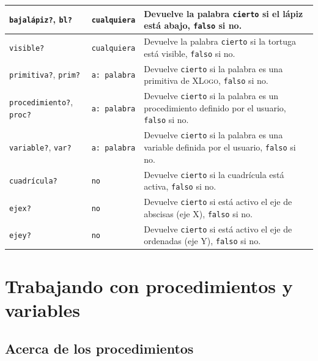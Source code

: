 \begin{center}
\begin{longtable}{|m{3cm}|m{3cm}|m{9cm}|}
   \texttt{bajal\'apiz?}, \index{bajal\'apiz?@\texttt{bajal\'apiz?}} 
     \texttt{bl?} \index{bl?@\texttt{bl?}} & \texttt{cualquiera} &
        Devuelve la palabra \texttt{cierto} si el l\'apiz est\'a abajo,
        \texttt{falso} si no. \\ \hline 
   \texttt{visible?} \index{visible?@\texttt{visible?}} &
      \texttt{cualquiera} & 
        Devuelve la palabra \texttt{cierto} si la tortuga est\'a visible,
        \texttt{falso} si no. \\ \hline 
   \texttt{primitiva?}, \index{primitiva?@\texttt{primitiva?}}
     \texttt{prim?} \index{prim?@\texttt{prim?}} & \texttt{a: palabra} &
        Devuelve \texttt{cierto} si la palabra es una primitiva de
        \textsc{XLogo}, \texttt{falso} si no. \\ \hline 
   \texttt{procedimiento?}, \index{procedimiento?@\texttt{procedimiento?}}
     \texttt{proc?} \index{proc?@\texttt{proc?}} & \texttt{a: palabra} &
        Devuelve \texttt{cierto} si la palabra es un procedimiento definido
        por el usuario, \texttt{falso} si no. \\ \hline
   \texttt{variable?}, \index{variable?@\texttt{variable?}}
     \texttt{var?} \index{var?@\texttt{var?}} & \texttt{a: palabra} &
        Devuelve \texttt{cierto} si la palabra es una variable definida
        por el usuario, \texttt{falso} si no. \\ \hline
   \texttt{cuadr\'icula?} \index{cuadr\'icula?@\texttt{cuadr\'icula?}} & \texttt{no} &
        Devuelve \texttt{cierto} si la cuadr\'icula est\'a activa,
        \texttt{falso} si no. \\ \hline
   \texttt{ejex?} \index{ejex?@\texttt{ejex?}} & \texttt{no} &
        Devuelve \texttt{cierto} si est\'a activo el eje de abscisas (eje X), 
        \texttt{falso} si no. \\ \hline
   \texttt{ejey?} \index{ejey?@\texttt{ejey?}} & \texttt{no} &
        Devuelve \texttt{cierto} si est\'a activo el eje de ordenadas (eje Y), 
        \texttt{falso} si no. \\ \hline
\end{longtable} \end{center}

\section{Trabajando con procedimientos y variables}
   \label{Procedimientos-Variables}

\subsection{Acerca de los procedimientos}
   \label{Acerca-Procedimientos}

